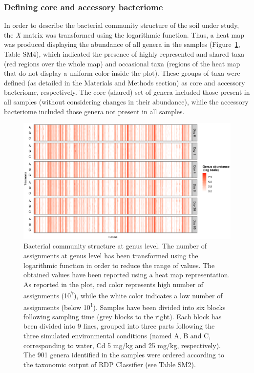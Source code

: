 \subsubsection{Defining core and accessory bacteriome}
In order to describe the bacterial community structure of the soil under study, the \textit{X} matrix was transformed using the logarithmic function. Thus, a heat map was produced displaying the abundance of all genera in the samples (Figure~\ref{fig:3rom}, Table SM4), which indicated the presence of highly represented and shared taxa (red regions over the whole map) and occasional taxa (regions of the heat map that do not display a uniform color inside the plot). These groups of taxa were defined (as detailed in the Materials and Methods section) as core and accessory bacteriome, respectively. The core (shared) set of genera included those present in all samples (without considering changes in their abundance), while the accessory bacteriome included those genera not present in all samples.\\
\begin{figure}[!tb]
	\centering
	\includegraphics[width=1\textwidth]{./figures/Chapter_3/Fig3.eps}
  	\caption{Bacterial community structure at genus level. The number of assignments at genus level has been transformed using the logarithmic function in order to reduce the range of values. The obtained values have been reported using a heat map representation. As reported in the plot, red color represents high number of assignments (10\textsuperscript{7}), while the white color indicates a low number of assignments (below 10\textsuperscript{1}). Samples have been divided into six blocks following sampling time (grey blocks to the right). Each block has been divided into 9 lines, grouped into three parts following the three simulated environmental conditions (named A, B and C, corresponding to water, Cd 5 mg/kg and 25 mg/kg, respectively). The 901 genera identified in the samples were ordered according to the taxonomic output of RDP Classifier (see Table SM2). \label{fig:3rom}}
\end{figure}
